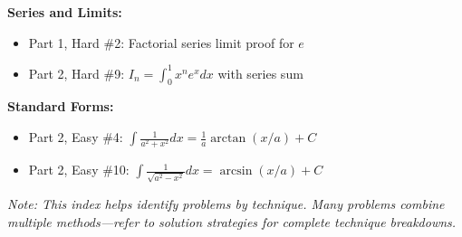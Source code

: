 \textbf{Series and Limits:}
\begin{itemize}
  \item Part 1, Hard \#2: Factorial series limit proof for $e$
  \item Part 2, Hard \#9: $I_n = \int_0^1 x^n e^x dx$ with series sum
\end{itemize}

\textbf{Standard Forms:}
\begin{itemize}
  \item Part 2, Easy \#4: $\int \frac{1}{a^2+x^2}dx = \frac{1}{a}\arctan(x/a) + C$
  \item Part 2, Easy \#10: $\int \frac{1}{\sqrt{a^2-x^2}}dx = \arcsin(x/a) + C$
\end{itemize}

\vspace{1em}
\noindent\textit{Note: This index helps identify problems by technique. Many problems combine multiple methods---refer to solution strategies for complete technique breakdowns.}
